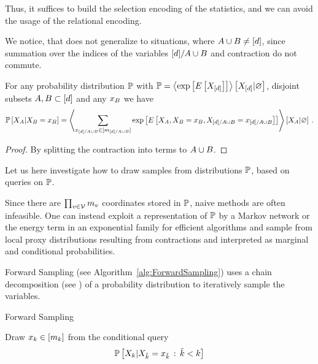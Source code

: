 Thus, it suffices to build the selection encoding of the statistics, and we can avoid the usage of the relational encoding.

% 
We notice, that  does not generalize to situations, where $A\cup B\neq[d]$, since summation over the indices of the variables $[d]/A\cup B$ and contraction do not commute.


\begin{lemma}  %
	For any probability distribution $\mathbb{P}$ with $\mathbb{P}= \left\langle \mathrm{exp}\left[E\left[X_{[d]}\right]\right]\right\rangle \left[ X_{[d]} | \varnothing \right]$, disjoint subsets $A,B \subset [d]$ and any $x_{B}$ we have
		\[ \mathbb{P}\left[X_{A}|X_{B}=x_{B}\right] 
			=
			\left\langle 
			 \sum_{x_{[d]/A\cup B}\in[m_{[d]/A\cup B}]} 
				 \mathrm{exp}\left[E\left[X_{A},X_{B}=x_{B},X_{[d]/A\cup B}=x_{[d]/A\cup B}\right]\right]
		\right\rangle \left[ X_{A} | \varnothing \right] \, .\]
\end{lemma}
\begin{proof}
	By splitting the contraction into terms to $A\cup B$. %
\end{proof}






Let us here investigate how to draw samples from distributions $\mathbb{P}$, based on queries on $\mathbb{P}$.

Since there are $\prod_{v\in\mathcal{V}}m_{v}$ coordinates stored in $\mathbb{P}$, naive methods are often infeasible.
One can instead exploit a representation of $\mathbb{P}$ by a Markov network or the energy term in an exponential family for efficient algorithms and sample from local proxy distributions resulting from contractions and interpreted as marginal and conditional probabilities.


Forward Sampling (see Algorithm~\ref{alg:ForwardSampling}) uses a chain decomposition (see ) of a probability distribution to iteratively sample the variables.

\begin{algorithm}[hbt!]
\caption{Forward Sampling}\label{alg:ForwardSampling}
\begin{algorithmic}
\For{$\catenumeratorin$}
	\State Draw $x_{k}\in[m_{k}]$ from the conditional query
		\[ \mathbb{P}\left[X_{k}|X_{\tilde{k}}=x_{\tilde{k}} \, : \, \tilde{k} < k\right] \]
\EndFor
\end{algorithmic}
\end{algorithm}

